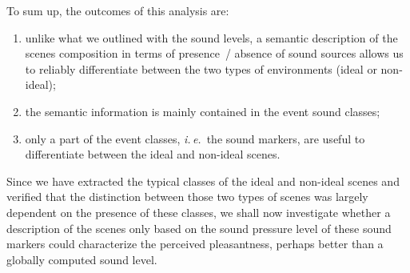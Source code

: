 \documentclass[12pt]{elsarticle}
\newcommand{\ie}{\emph{i.\,e.}}
\begin{document}
%

To sum up, the outcomes of this analysis are:

\begin{enumerate}
\item unlike what we outlined with the sound levels, a semantic description of the scenes composition in terms of presence~/ absence of sound sources allows us to reliably differentiate between the two types of environments (ideal or non-ideal);
\item the semantic information is mainly contained in the event sound classes;
\item only a part of the event classes, \ie~the sound markers, are useful to differentiate between the ideal and non-ideal scenes.
\end{enumerate}


Since we have extracted the typical classes of the ideal and non-ideal scenes and verified that the distinction between those two types of scenes was largely dependent on the presence of these classes, we shall now investigate whether a description of the scenes only based on the sound pressure level of these sound markers could characterize the perceived pleasantness, perhaps better than a globally computed sound level.

\end{document}
